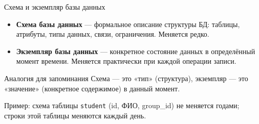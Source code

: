 \documentclass[aspectratio=169]{beamer}
\begin{document}
\begin{frame}{Схема и экземпляр базы данных}

\begin{itemize}
  \item \textbf{Схема базы данных} — формальное описание
        структуры БД: таблицы, атрибуты, типы данных,
        связи, ограничения. Меняется редко.
  \item \textbf{Экземпляр базы данных} — конкретное состояние
        данных в определённый момент времени. Меняется
        практически при каждой операции записи.
\end{itemize}

\vspace{0.4cm}

\begin{alertblock}{Аналогия для запоминания}
Схема — это «тип» (структура), экземпляр — это «значение»
(конкретное содержимое) в данный момент.
\end{alertblock}

\vspace{0.2cm}
\footnotesize
Пример: схема таблицы \texttt{student} (id, ФИО, group\_id)
не меняется годами; строки этой таблицы меняются
каждый день.

\end{frame}
\end{document}
